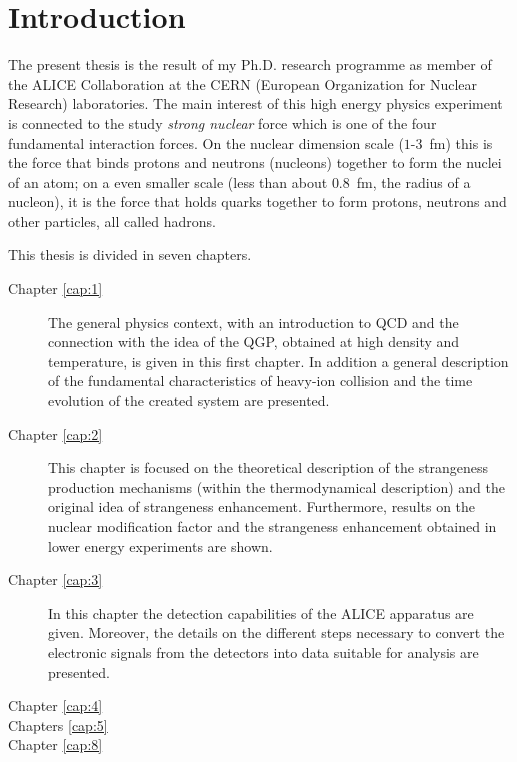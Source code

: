 \clearpage
{}
\chapter*{Introduction}
The present thesis is the result of my Ph.D. research programme as member of the ALICE Collaboration at the CERN (European Organization for Nuclear Research) laboratories. The main interest of this high energy physics experiment is connected to the study \textit{strong nuclear} force which is one of the four fundamental interaction forces. On the nuclear dimension scale (\mbox{$1$-$3$ fm}) this is the force that binds protons and neutrons (nucleons) together to form the nuclei of an atom; on a even smaller scale (less than about \mbox{$0.8$ fm}, the radius of a nucleon), it is the force that holds quarks together to form protons, neutrons and other particles, all called hadrons. 


This thesis is divided in seven chapters. 

\begin{description}
\item[Chapter \ref{cap:1}] The general physics context,  with an introduction to QCD and the connection with the idea of the QGP, obtained at high density and temperature, is given in this first chapter. In addition a general description of the fundamental characteristics of heavy-ion collision and the time evolution of the created system are presented. 
\item[Chapter \ref{cap:2}] This chapter is focused on the theoretical description of the strangeness production mechanisms (within the thermodynamical description) and the original idea of strangeness enhancement. Furthermore, results on the nuclear modification factor and the strangeness enhancement obtained in lower energy experiments are shown.
\item[Chapter \ref{cap:3}] In this chapter the detection capabilities of the ALICE apparatus are given. Moreover, the details on the different steps necessary to convert the electronic signals from the detectors into data suitable for analysis are presented.
\item[Chapter \ref{cap:4}]
\item[Chapters \ref{cap:5} 
\item[Chapters \ref{cap:6} 
\item[Chapter \ref{cap:7}]
\item[Chapter \ref{cap:8}]


\end{description}



        
